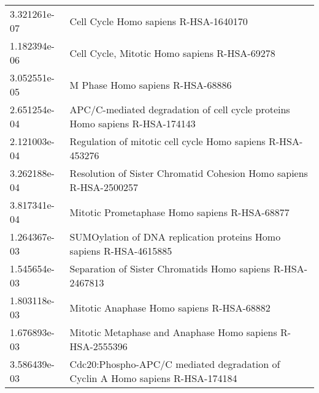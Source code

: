 \begin{longtable}{p{2.4cm}p{14.5cm}}
\bottomrule
\endlastfoot
             3.321261e-07 &                                                                                                                  Cell Cycle Homo sapiens R-HSA-1640170 \\
             1.182394e-06 &                                                                                                           Cell Cycle, Mitotic Homo sapiens R-HSA-69278 \\
             3.052551e-05 &                                                                                                                       M Phase Homo sapiens R-HSA-68886 \\
             2.651254e-04 &                                                                            APC/C-mediated degradation of cell cycle proteins Homo sapiens R-HSA-174143 \\
             2.121003e-04 &                                                                                             Regulation of mitotic cell cycle Homo sapiens R-HSA-453276 \\
             3.262188e-04 &                                                                                     Resolution of Sister Chromatid Cohesion Homo sapiens R-HSA-2500257 \\
             3.817341e-04 &                                                                                                          Mitotic Prometaphase Homo sapiens R-HSA-68877 \\
             1.264367e-03 &                                                                                     SUMOylation of DNA replication proteins Homo sapiens R-HSA-4615885 \\
             1.545654e-03 &                                                                                             Separation of Sister Chromatids Homo sapiens R-HSA-2467813 \\
             1.803118e-03 &                                                                                                              Mitotic Anaphase Homo sapiens R-HSA-68882 \\
             1.676893e-03 &                                                                                              Mitotic Metaphase and Anaphase Homo sapiens R-HSA-2555396 \\
             3.586439e-03 &                                                                         Cdc20:Phospho-APC/C mediated degradation of Cyclin A Homo sapiens R-HSA-174184 \\

\end{longtable}
